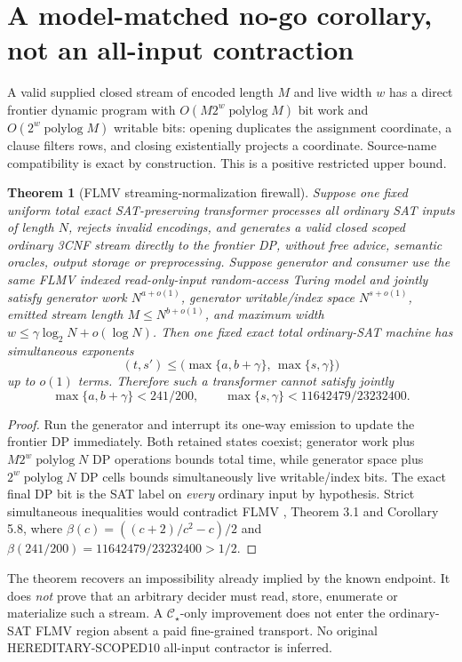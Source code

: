 \documentclass[11pt]{article}
\newtheorem{theorem}{Theorem}
\newcommand{\CS}{\mathcal C_\star}
\begin{document}
\section{A model-matched no-go corollary, not an all-input contraction}
A valid supplied closed stream of encoded length $M$ and live width $w$ has a direct frontier dynamic program with $O(M2^w\operatorname{polylog} M)$ bit work and $O(2^w\operatorname{polylog}M)$ writable bits: opening duplicates the assignment coordinate, a clause filters rows, and closing existentially projects a coordinate. Source-name compatibility is exact by construction. This is a positive restricted upper bound.

\begin{theorem}[FLMV streaming-normalization firewall]
Suppose one fixed uniform total exact SAT-preserving transformer processes \emph{all ordinary SAT inputs} of length $N$, rejects invalid encodings, and generates a \emph{valid closed scoped ordinary 3CNF stream} directly to the frontier DP, without free advice, semantic oracles, output storage or preprocessing. Suppose generator and consumer use the same FLMV indexed read-only-input random-access Turing model and jointly satisfy generator work $N^{a+o(1)}$, generator writable/index space $N^{s+o(1)}$, emitted stream length $M\le N^{b+o(1)}$, and maximum width $w\le \gamma\log_2N+o(\log N)$. Then one fixed exact total ordinary-SAT machine has simultaneous exponents
\[
\boxed{(t,s')\le\bigl(\max\{a,b+\gamma\},\,\max\{s,\gamma\}\bigr)}
\]
up to $o(1)$ terms. Therefore such a transformer cannot satisfy jointly
\[
\boxed{\max\{a,b+\gamma\}<241/200,\qquad
\max\{s,\gamma\}<11642479/23232400.}
\]
\end{theorem}
\begin{proof}
Run the generator and interrupt its one-way emission to update the frontier DP immediately. Both retained states coexist; generator work plus $M2^w\operatorname{polylog}N$ DP operations bounds total time, while generator space plus $2^w\operatorname{polylog}N$ DP cells bounds simultaneously live writable/index bits. The exact final DP bit is the SAT label on \emph{every} ordinary input by hypothesis. Strict simultaneous inequalities would contradict FLMV \cite{flmv}, Theorem 3.1 and Corollary 5.8, where $\beta(c)=((c+2)/c^2-c)/2$ and $\beta(241/200)=11642479/23232400>1/2$.
\end{proof}
\noindent The theorem recovers an impossibility already implied by the known endpoint. It does \emph{not} prove that an arbitrary decider must read, store, enumerate or materialize such a stream. A $\CS$-only improvement does not enter the ordinary-SAT FLMV region absent a paid fine-grained transport. No original HEREDITARY-SCOPED10 all-input contractor is inferred.
\end{document}
